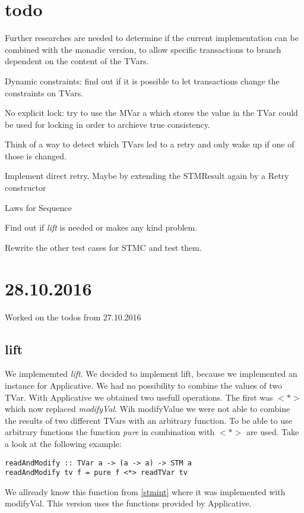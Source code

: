 \documentclass[a4paper,10pt]{article}
\begin{document}
\section{todo}
Further researches are needed to determine if the current implementation can be combined with the monadic version,
to allow specific transactions to branch dependent on the content of the TVars.

Dynamic constraints: find out if it is possible to let transactions change the constraints on TVars.

No explicit lock: try to use the MVar a which stores the value in the TVar could be used for locking in order 
to archieve true consistency.

Think of a way to detect which TVars led to a retry and only wake up if one of those is changed.

Implement direct retry. Maybe by extending the STMResult again by a Retry constructor

Laws for Sequence

Find out if \textit{lift} is needed or makes any kind problem. 

Rewrite the other test cases for STMC and test them.

\section{28.10.2016}
Worked on the todos from 27.10.2016
\subsection{lift}
We implememted \textit{lift}. We decided to implement lift, because we implemented an instance for Applicative.
We had no possibility to combine the values of two TVar. With Applicative we obtained two usefull operations. 
The first was $<*>$ which now replaced \textit{modifyVal}. Wih modifyValue we were not able to combine the results
of two different TVars with an arbitrary function. To be able to use arbitrary functions the function \textit{pure} 
in combination with $<*>$ are used. Take a look at the following example:
\begin{lstlisting}
readAndModify :: TVar a -> (a -> a) -> STM a
readAndModify tv f = pure f <*> readTVar tv
\end{lstlisting}
We allready know this function from \ref{stmint} where it was implemented with modifyVal. This version uses the 
functions provided by Applicative.
\end{document}
